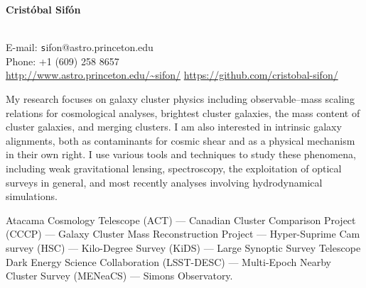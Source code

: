 \documentclass[11pt]{article}
\begin{document}
\begin{minipage}[b]{0.46\linewidth}
\flushleft
\hspace{-0.7cm}
{\bf\huge Crist\'obal Sif\'on}\\\vspace{0.2cm}
\\
\end{minipage}
\begin{minipage}[b]{0.49\linewidth}
\flushright
{\large E-mail: {\texttt sifon@astro.princeton.edu}\\
        Phone: +1 (609) 258 8657\\
        \url{http://www.astro.princeton.edu/~sifon/}
        \url{https://github.com/cristobal-sifon/}}
\end{minipage}
\vspace{0.4cm}
\hline




My research focuses on galaxy cluster physics including observable--mass scaling relations for cosmological analyses, brightest cluster galaxies, the mass content of cluster galaxies, and merging clusters. I am also interested in intrinsic galaxy alignments, both as contaminants for cosmic shear and as a physical mechanism in their own right. I use various tools and techniques to study these phenomena, including weak gravitational lensing, spectroscopy, the exploitation of optical surveys in general, and most recently analyses involving hydrodynamical simulations.

\vspace{0.5cm}
{
 Atacama Cosmology Telescope (ACT) ---
 Canadian Cluster Comparison Project (CCCP) ---
 Galaxy Cluster Mass Reconstruction Project ---
 Hyper-Suprime Cam survey (HSC) ---
 Kilo-Degree Survey (KiDS) ---
 Large Synoptic Survey Telescope Dark Energy Science Collaboration (LSST-DESC) ---
 Multi-Epoch Nearby Cluster Survey (MENeaCS) ---
 Simons Observatory.
}
\end{document}
